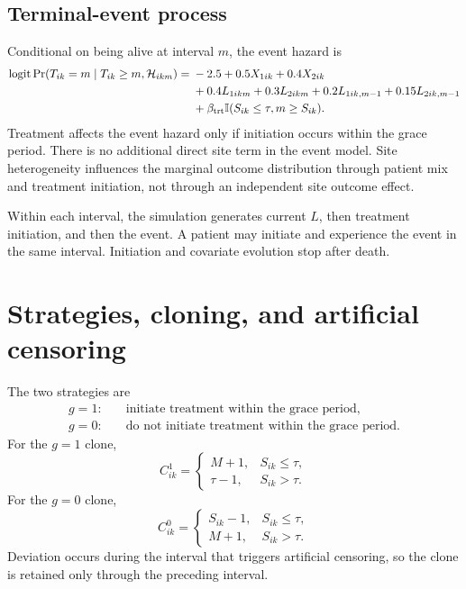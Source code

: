 \documentclass[11pt]{article}
\newcommand{\ind}{\mathbb{I}}
\newcommand{\Prb}{\operatorname{Pr}}
\begin{document}
\subsection{Terminal-event process}

Conditional on being alive at interval $m$, the event hazard is
\begin{align}
\label{eq:event-dgp}
  \operatorname{logit}
  \Prb(T_{ik}=m\mid T_{ik}\geq m,\mathcal H_{ikm})
  ={}&-2.5+0.5X_{1ik}+0.4X_{2ik} \notag\\
     &+0.4L_{1ikm}+0.3L_{2ikm}
      +0.2L_{1ik,m-1}+0.15L_{2ik,m-1} \notag\\
     &+\beta_{\mathrm{trt}}
       \ind(S_{ik}\leq\tau,m\geq S_{ik}).
\end{align}
Treatment affects the event hazard only if initiation occurs within the grace
period. There is no additional direct site term in the event model. Site
heterogeneity influences the marginal outcome distribution through patient
mix and treatment initiation, not through an independent site outcome effect.

Within each interval, the simulation generates current $L$, then treatment
initiation, and then the event. A patient may initiate and experience the event
in the same interval. Initiation and covariate evolution stop after death.

\section{Strategies, cloning, and artificial censoring}

The two strategies are
\begin{align*}
  g=1:&\quad \text{initiate treatment within the grace period},\\
  g=0:&\quad \text{do not initiate treatment within the grace period}.
\end{align*}
For the $g=1$ clone,
\[
  C^1_{ik}
  =\begin{cases}
      M+1, & S_{ik}\leq\tau,\\
      \tau-1, & S_{ik}>\tau.
    \end{cases}
\]
For the $g=0$ clone,
\[
  C^0_{ik}
  =\begin{cases}
      S_{ik}-1, & S_{ik}\leq\tau,\\
      M+1, & S_{ik}>\tau.
    \end{cases}
\]
Deviation occurs during the interval that triggers artificial censoring, so
the clone is retained only through the preceding interval.
\end{document}
